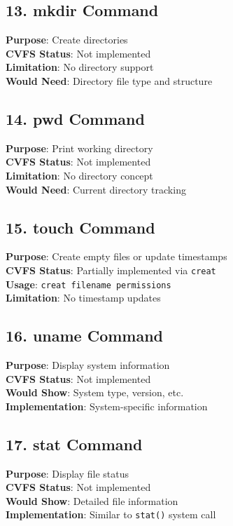 \documentclass[11pt,a4paper]{article}
\begin{document}
\subsection{13. mkdir Command}
\textbf{Purpose}: Create directories\\
\textbf{CVFS Status}: Not implemented\\
\textbf{Limitation}: No directory support\\
\textbf{Would Need}: Directory file type and structure

\subsection{14. pwd Command}
\textbf{Purpose}: Print working directory\\
\textbf{CVFS Status}: Not implemented\\
\textbf{Limitation}: No directory concept\\
\textbf{Would Need}: Current directory tracking

\subsection{15. touch Command}
\textbf{Purpose}: Create empty files or update timestamps\\
\textbf{CVFS Status}: Partially implemented via \texttt{creat}\\
\textbf{Usage}: \texttt{creat filename permissions}\\
\textbf{Limitation}: No timestamp updates

\subsection{16. uname Command}
\textbf{Purpose}: Display system information\\
\textbf{CVFS Status}: Not implemented\\
\textbf{Would Show}: System type, version, etc.\\
\textbf{Implementation}: System-specific information

\subsection{17. stat Command}
\textbf{Purpose}: Display file status\\
\textbf{CVFS Status}: Not implemented\\
\textbf{Would Show}: Detailed file information\\
\textbf{Implementation}: Similar to \texttt{stat()} system call
\end{document}
